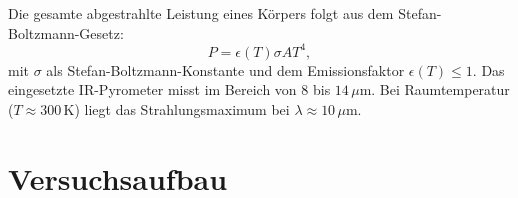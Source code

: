 Die gesamte abgestrahlte Leistung eines Körpers folgt aus dem Stefan-Boltzmann-Gesetz:
\begin{equation}
    P = \epsilon(T) \sigma A T^4,
\end{equation}
mit $\sigma$ als Stefan-Boltzmann-Konstante und dem Emissionsfaktor $\epsilon(T) \leq 1$.  
Das eingesetzte IR-Pyrometer misst im Bereich von $8$ bis $14\,\mu$m. Bei Raumtemperatur ($T \approx 300\,$K) liegt das Strahlungsmaximum bei $\lambda \approx 10\,\mu$m.

\section{Versuchsaufbau}
